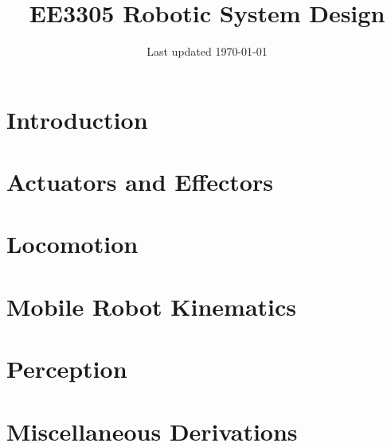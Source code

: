 \documentclass[a4paper, 10pt, final, twocolumn]{article}
\title{EE3305 Robotic System Design}
\author{Last updated \today}
\date{}
\begin{document}
\maketitle
\tableofcontents%
\section{Introduction}

\section{Actuators and Effectors}

\section{Locomotion}

\section{Mobile Robot Kinematics}

\section{Perception}

\appendix
\section{Miscellaneous Derivations}

\end{document}

